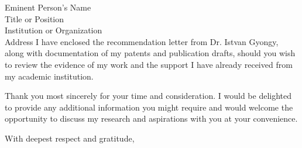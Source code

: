 \documentclass[11pt,a4paper]{letter}
\begin{document}
\begin{letter}{Eminent Person's Name\\Title or Position\\Institution or Organization\\Address}
I have enclosed the recommendation letter from Dr. Istvan Gyongy, along with documentation of my patents and publication drafts, should you wish to review the evidence of my work and the support I have already received from my academic institution.

Thank you most sincerely for your time and consideration. I would be delighted to provide any additional information you might require and would welcome the opportunity to discuss my research and aspirations with you at your convenience.

\closing{With deepest respect and gratitude,}

\signature{Your Name}


\end{letter}
\end{document}
